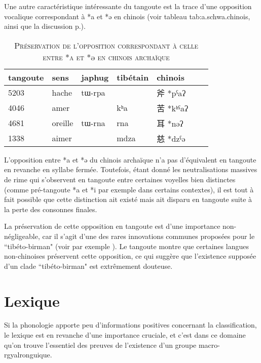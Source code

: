 \documentclass[oldfontcommands,twoside,a4paper,11pt,draft]{memoir}
\newcommand{\zh}[1]{{\cn #1}}
\newcommand{\captionb}[1]{\caption{\textsc{#1}}}
\newcommand{\tgz}[1]{#1 \mo{#1} \tg{#1}}
\begin{document}
 
 Une autre caractéristique intéressante du tangoute est la  trace d'une opposition vocalique correspondant à  *a et *ə en chinois (voir tableau {tab:a.schwa.chinois}, ainsi que la discussion p.\pageref{rimes:01:3:ju/a}).
 \begin{table}
\captionb{Préservation de l'opposition correspondant à celle entre *a et *ə en chinois archaïque } \label{tab:a.schwa.chinois}
\begin{tabular}{lllllll}
\toprule
tangoute & sens & japhug & tibétain & chinois\\
\midrule
 \tgz{5203} &   			hache   &  	tɯ-rpa   &  	   &  	\zh{斧} *pˁaʔ   \\  
\tgz{4046} &   			amer   &  	   &  	kʰa   &  	\zh{苦} *kʰˁaʔ   \\  
\midrule
\tgz{4681} &   			oreille   &  	tɯ-rna   &  	rna   &  	\zh{耳} *nəʔ   \\  
\tgz{1338} &   			aimer   &  	   &  	mdza   &  	\zh{慈} *dzˁə   \\  

\bottomrule
\end{tabular}
 \end{table} 
L'opposition entre *a et *ə du chinois archaïque n'a pas d'équivalent en tangoute en revanche en syllabe fermée. Toutefois, étant donné les neutralisations massives de rime qui s'observent en tangoute entre certaines voyelles bien distinctes (comme pré-tangoute *a et *i par exemple dans certains contextes), il est tout à fait possible que cette distinction ait existé mais ait disparu en tangoute suite à la perte des consonnes finales.

La préservation de cette opposition en tangoute est d'une importance non-négligeable, car il s'agit d'une des rares innovations communes proposées pour le ``tibéto-birman" (voir par exemple \citealt{handel08st}). Le tangoute montre que certaines langues non-chinoises préservent cette opposition, ce qui suggère que l'existence supposée d'un clade ``tibéto-birman" est extrêmement douteuse. 


\section{Lexique}

Si la phonologie apporte peu d'informations positives concernant la classification, le lexique est en revanche d'une importance cruciale, et c'est dans ce domaine qu'on trouve l'essentiel des preuves de l'existence d'un groupe macro-rgyalronguique.
\end{document}
